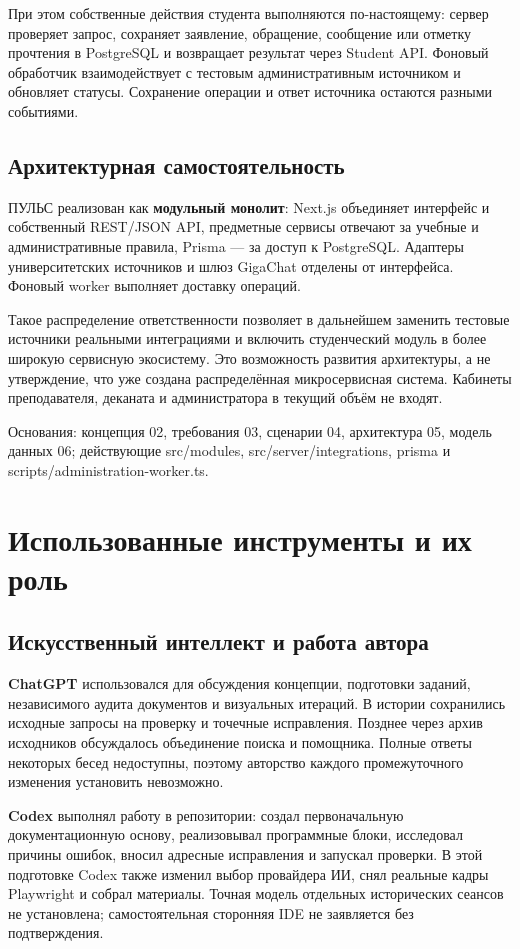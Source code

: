\documentclass[11pt,a4paper]{article}
\newcommand{\source}[1]{{\small\color{muted}#1\par}}
\begin{document}
При этом собственные действия студента выполняются по-настоящему: сервер проверяет запрос, сохраняет заявление, обращение, сообщение или отметку прочтения в PostgreSQL и возвращает результат через Student API. Фоновый обработчик взаимодействует с тестовым административным источником и обновляет статусы. Сохранение операции и ответ источника остаются разными событиями.

\subsection{Архитектурная самостоятельность}
ПУЛЬС реализован как \textbf{модульный монолит}: Next.js объединяет интерфейс и собственный REST/JSON API, предметные сервисы отвечают за учебные и административные правила, Prisma — за доступ к PostgreSQL. Адаптеры университетских источников и шлюз GigaChat отделены от интерфейса. Фоновый worker выполняет доставку операций.

Такое распределение ответственности позволяет в дальнейшем заменить тестовые источники реальными интеграциями и включить студенческий модуль в более широкую сервисную экосистему. Это возможность развития архитектуры, а не утверждение, что уже создана распределённая микросервисная система. Кабинеты преподавателя, деканата и администратора в текущий объём не входят.
\source{Основания: концепция 02, требования 03, сценарии 04, архитектура 05, модель данных 06; действующие src/modules, src/server/integrations, prisma и scripts/administration-worker.ts.}
\clearpage
\section{Использованные инструменты и их роль}
\subsection{Искусственный интеллект и работа автора}
\textbf{ChatGPT} использовался для обсуждения концепции, подготовки заданий, независимого аудита документов и визуальных итераций. В истории сохранились исходные запросы на проверку и точечные исправления. Позднее через архив исходников обсуждалось объединение поиска и помощника. Полные ответы некоторых бесед недоступны, поэтому авторство каждого промежуточного изменения установить невозможно.

\textbf{Codex} выполнял работу в репозитории: создал первоначальную документационную основу, реализовывал программные блоки, исследовал причины ошибок, вносил адресные исправления и запускал проверки. В этой подготовке Codex также изменил выбор провайдера ИИ, снял реальные кадры Playwright и собрал материалы. Точная модель отдельных исторических сеансов не установлена; самостоятельная сторонняя IDE не заявляется без подтверждения.
\end{document}
